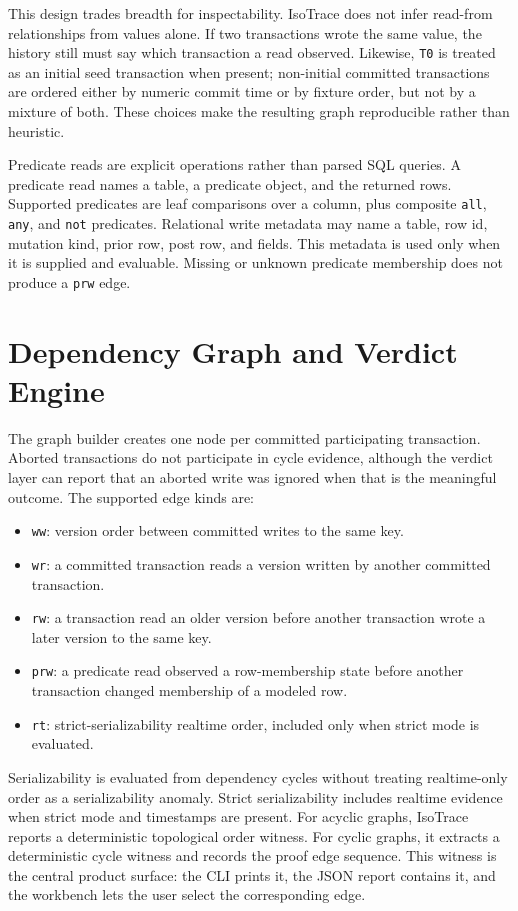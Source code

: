 \documentclass[10pt]{article}
\newcommand{\code}[1]{\texttt{#1}}
\begin{document}
This design trades breadth for inspectability. IsoTrace does not infer read-from relationships from values alone. If two transactions wrote the same value, the history still must say which transaction a read observed. Likewise, \code{T0} is treated as an initial seed transaction when present; non-initial committed transactions are ordered either by numeric commit time or by fixture order, but not by a mixture of both. These choices make the resulting graph reproducible rather than heuristic.

Predicate reads are explicit operations rather than parsed SQL queries. A predicate read names a table, a predicate object, and the returned rows. Supported predicates are leaf comparisons over a column, plus composite \code{all}, \code{any}, and \code{not} predicates. Relational write metadata may name a table, row id, mutation kind, prior row, post row, and fields. This metadata is used only when it is supplied and evaluable. Missing or unknown predicate membership does not produce a \code{prw} edge.

\section{Dependency Graph and Verdict Engine}

The graph builder creates one node per committed participating transaction. Aborted transactions do not participate in cycle evidence, although the verdict layer can report that an aborted write was ignored when that is the meaningful outcome. The supported edge kinds are:

\begin{itemize}
\item \code{ww}: version order between committed writes to the same key.
\item \code{wr}: a committed transaction reads a version written by another committed transaction.
\item \code{rw}: a transaction read an older version before another transaction wrote a later version to the same key.
\item \code{prw}: a predicate read observed a row-membership state before another transaction changed membership of a modeled row.
\item \code{rt}: strict-serializability realtime order, included only when strict mode is evaluated.
\end{itemize}

Serializability is evaluated from dependency cycles without treating realtime-only order as a serializability anomaly. Strict serializability includes realtime evidence when strict mode and timestamps are present. For acyclic graphs, IsoTrace reports a deterministic topological order witness. For cyclic graphs, it extracts a deterministic cycle witness and records the proof edge sequence. This witness is the central product surface: the CLI prints it, the JSON report contains it, and the workbench lets the user select the corresponding edge.
\end{document}
